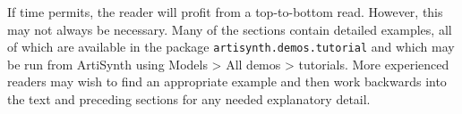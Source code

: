 If time permits, the reader will profit from a top-to-bottom read.
However, this may not always be necessary. Many of the sections
contain detailed examples, all of which are available in
the package {\tt artisynth.demos.tutorial} and which may be run from
ArtiSynth using {\sf Models > All demos > tutorials}. 
More experienced readers may wish to find an appropriate example and
then work backwards into the text and preceding sections for any
needed explanatory detail.

\mainmatter












\iflatexml


\else
\printbibliography[title={References}]
%
%
\fi



